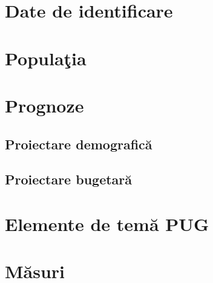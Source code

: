 \documentclass[11pt,a4paper]{scrartcl}
\begin{document}



\section{Date de identificare}

\begin{flushleft}


\end{flushleft}


\section{Populaţia}



\section{Prognoze}


\subsection{Proiectare demografică}


\subsection{Proiectare bugetară}


\section{Elemente de temă PUG}


\section{Măsuri}
\end{document}
